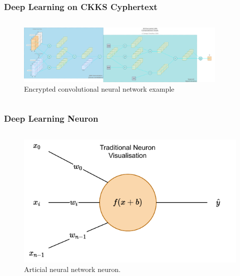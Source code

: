 \documentclass[aspectratio=169]{beamer}
\begin{document}
  \begin{frame}
    \frametitle{Deep Learning on CKKS Cyphertext}
    \begin{columns}
      \begin{column}{1\textwidth}
        \begin{figure}[th!]
          \centering
          \includegraphics[width=0.9\textwidth]{encrypted_cnn.png}
          \caption{Encrypted convolutional neural network example \autocite{repository}}
          \label{fig:cnn}
        \end{figure}
      \end{column}
    \end{columns}
  \end{frame}

  \begin{frame}
    \frametitle{Deep Learning Neuron}
    \begin{columns}
      \begin{column}{0.5\textwidth}
        \begin{figure}[th!]
          \centering
          \includegraphics[width=1\textwidth]{neuron.pdf}
          \caption{Articial neural network neuron. \autocite{repository}}
          \label{fig:neuron}
        \end{figure}
      \end{column}
    \end{columns}
  \end{frame}
\end{document}
